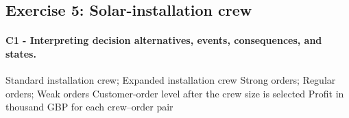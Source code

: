 	\subsection{Exercise 5: Solar-installation crew}
	\label{sec:problem5-solar-installation-crew-c1-c2}
	
	\paragraph*{C1 - Interpreting decision alternatives, events, consequences, and states.}
	\label{subsec:problem5-solar-installation-crew-c1}
	\DecisionElementsTable
	{Standard installation crew; Expanded installation crew}
	{Strong orders; Regular orders; Weak orders}
	{Customer-order level after the crew size is selected}
	{Profit in thousand GBP for each crew--order pair}
	
	

